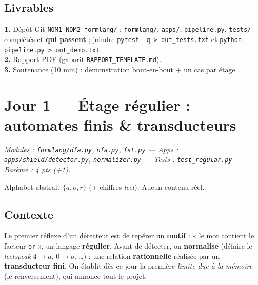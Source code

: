 \documentclass[11pt,a4paper]{scrartcl}
\begin{document}
\subsection{Livrables}
\textbf{1.} Dépôt Git \texttt{NOM1\_NOM2\_formlang/} : \texttt{formlang/}, \texttt{apps/},
\texttt{pipeline.py}, \texttt{tests/} complétés et \textbf{qui passent} ; joindre
\texttt{pytest -q > out\_tests.txt} et \texttt{python pipeline.py > out\_demo.txt}.\\
\textbf{2.} Rapport PDF (gabarit \texttt{RAPPORT\_TEMPLATE.md}).\\
\textbf{3.} Soutenance (10 min) : démonstration bout-en-bout + un cas par étage.

\clearpage
\section{Jour 1 — Étage régulier : automates finis \& transducteurs}
\emph{Modules : \texttt{formlang/dfa.py}, \texttt{nfa.py}, \texttt{fst.py} — Apps :
\texttt{apps/shield/detector.py}, \texttt{normalizer.py} — Tests : \texttt{test\_regular.py}
— Barème : 4 pts (+1).}

\begin{ethique}Alphabet abstrait $\{a,o,r\}$ (+ chiffres \emph{leet}). Aucun contenu réel.\end{ethique}

\subsection{Contexte}
Le premier réflexe d'un détecteur est de repérer un \textbf{motif} : « le mot contient le
facteur \texttt{or} », un langage \textbf{régulier}. Avant de détecter, on
\textbf{normalise} (défaire le \emph{leetspeak} $4\!\to\!a$, $0\!\to\!o$, \dots) : une
relation \textbf{rationnelle} réalisée par un \textbf{transducteur fini}. On établit dès
ce jour la première \emph{limite due à la mémoire} (le renversement), qui annonce tout le
projet.
\end{document}
